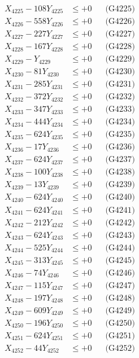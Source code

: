 \documentclass[a4paper,10pt]{article}
\begin{document}
{\begin{align}
X_{4225} - 108Y_{4225} &\leq +0 && \text{(G4225)} \\
X_{4226} - 558Y_{4226} &\leq +0 && \text{(G4226)} \\
X_{4227} - 227Y_{4227} &\leq +0 && \text{(G4227)} \\
X_{4228} - 167Y_{4228} &\leq +0 && \text{(G4228)} \\
X_{4229} - Y_{4229} &\leq +0 && \text{(G4229)} \\
X_{4230} - 81Y_{4230} &\leq +0 && \text{(G4230)} \\
\allowbreak
X_{4231} - 285Y_{4231} &\leq +0 && \text{(G4231)} \\
X_{4232} - 372Y_{4232} &\leq +0 && \text{(G4232)} \\
X_{4233} - 347Y_{4233} &\leq +0 && \text{(G4233)} \\
X_{4234} - 444Y_{4234} &\leq +0 && \text{(G4234)} \\
X_{4235} - 624Y_{4235} &\leq +0 && \text{(G4235)} \\
X_{4236} - 17Y_{4236} &\leq +0 && \text{(G4236)} \\
X_{4237} - 624Y_{4237} &\leq +0 && \text{(G4237)} \\
X_{4238} - 100Y_{4238} &\leq +0 && \text{(G4238)} \\
X_{4239} - 13Y_{4239} &\leq +0 && \text{(G4239)} \\
X_{4240} - 624Y_{4240} &\leq +0 && \text{(G4240)} \\
\allowbreak
X_{4241} - 624Y_{4241} &\leq +0 && \text{(G4241)} \\
X_{4242} - 212Y_{4242} &\leq +0 && \text{(G4242)} \\
X_{4243} - 624Y_{4243} &\leq +0 && \text{(G4243)} \\
X_{4244} - 525Y_{4244} &\leq +0 && \text{(G4244)} \\
X_{4245} - 313Y_{4245} &\leq +0 && \text{(G4245)} \\
X_{4246} - 74Y_{4246} &\leq +0 && \text{(G4246)} \\
X_{4247} - 115Y_{4247} &\leq +0 && \text{(G4247)} \\
X_{4248} - 197Y_{4248} &\leq +0 && \text{(G4248)} \\
X_{4249} - 609Y_{4249} &\leq +0 && \text{(G4249)} \\
X_{4250} - 196Y_{4250} &\leq +0 && \text{(G4250)} \\
\allowbreak
X_{4251} - 624Y_{4251} &\leq +0 && \text{(G4251)} \\
X_{4252} - 44Y_{4252} &\leq +0 && \text{(G4252)} \\

\end{align}}
\end{document}
